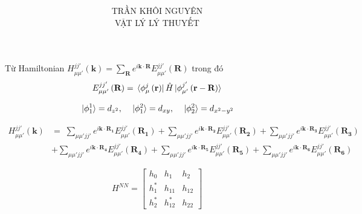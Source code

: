 \documentclass{article}
\title{\Huge{ }}
\begin{document}
\setlength{\parindent}{20pt} \newpage \author{TRẦN KHÔI NGUYÊN \\ VẬT LÝ LÝ THUYẾT} \maketitle

Từ Hamiltonian $H^{jj'}_{\mu\mu'} \left( \mathbf{k}\right) = \sum_{\mathbf{R}}
    e^{i \mathbf{k\cdot R}} E^{jj'}_{\mu\mu'} \left(\textbf{R}\right) $ trong đó
\begin{align*}
    E^{jj'}_{\mu\mu'} \left(\textbf{R}\right) = \bra*{\phi^j_\mu \left(\textbf{r}\right)}\hat{H}\ket*{\phi^{j'}_{\mu'}\left(\textbf{r} - \textbf{R}\right)}
\end{align*}

\begin{align*}
    \ket*{\phi^1_1} = d_{z^2} , \quad \ket*{\phi^2_1} = d_{xy} , \quad \ket*{\phi^2_2} = d_{x^2 - y^2}
\end{align*}

\begin{align*}
    H^{jj'}_{\mu\mu'} \left( \mathbf{k}\right) & =  \; \sum_{\mu\mu' jj'} e^{i \mathbf{k\cdot R_1}} E^{jj'}_{\mu\mu'} \left(\mathbf{R_1}\right)
    + \sum_{\mu\mu' jj'} e^{i \mathbf{k\cdot R_2}} E^{jj'}_{\mu\mu'} \left(\mathbf{R_2}\right)
    + \sum_{\mu\mu' jj'} e^{i \mathbf{k\cdot R_3}} E^{jj'}_{\mu\mu'} \left(\mathbf{R_3}\right)                                                  \\
                                               & + \sum_{\mu\mu' jj'} e^{i \mathbf{k\cdot R_4}} E^{jj'}_{\mu\mu'} \left(\mathbf{R_4}\right)
    + \sum_{\mu\mu' jj'} e^{i \mathbf{k\cdot R_5}} E^{jj'}_{\mu\mu'} \left(\mathbf{R_5}\right)
    + \sum_{\mu\mu' jj'} e^{i \mathbf{k\cdot R_6}} E^{jj'}_{\mu\mu'} \left(\mathbf{R_6}\right)
\end{align*}

\[
    \renewcommand{\arraystretch}{0.75}
    H^{NN} = \begin{bmatrix}
        h_{0}   & h_{1}    & h_{2}  \\
        h_{1}^* & h_{11}   & h_{12} \\
        h_{2}^* & h_{12}^* & h_{22}
    \end{bmatrix}
\]
\end{document}
